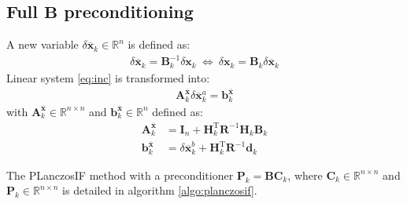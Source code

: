 \documentclass[12pt]{scrartcl}
\begin{document}
\subsection{Full $\mathbf{B}$ preconditioning}
A new variable $\delta \overline{\mathbf{x}}_k \in \mathbb{R}^n$ is defined as:
\begin{align}
\delta \overline{\mathbf{x}}_k = \mathbf{B}_k^{-1} \delta \mathbf{x}_k \ \Leftrightarrow \ \delta \mathbf{x}_k = \mathbf{B}_k \delta \overline{\mathbf{x}}_k
\end{align}
Linear system \eqref{eq:inc} is transformed into:
\begin{align}
\label{eq:inc_B}
\boxed{\mathbf{A}^{\overline{\mathbf{x}}}_k \delta \overline{\mathbf{x}}^a_k = \mathbf{b}^{\overline{\mathbf{x}}}_k}
\end{align}
with $\mathbf{A}^{\overline{\mathbf{x}}}_k \in \mathbb{R}^{n \times n}$ and $\mathbf{b}^{\overline{\mathbf{x}}}_k \in \mathbb{R}^{n}$ defined as:
\begin{align}
\mathbf{A}^{\overline{\mathbf{x}}}_k & = \mathbf{I}_n + \mathbf{H}_k^\mathrm{T} \mathbf{R}^{-1} \mathbf{H}_k \mathbf{B}_k \\
\mathbf{b}^{\overline{\mathbf{x}}}_k & =  \delta \overline{\mathbf{x}}^b_k + \mathbf{H}_k^\mathrm{T} \mathbf{R}^{-1} \mathbf{d}_k
\end{align}


The PLanczosIF method with a preconditioner $\mathbf{P}_k = \mathbf{B}\mathbf{C}_k$, where $\mathbf{C}_k \in \mathbb{R}^{n \times n}$ and $\mathbf{P}_k \in \mathbb{R}^{n \times n}$ is detailed in algorithm \ref{algo:planczosif}.\\
\end{document}

